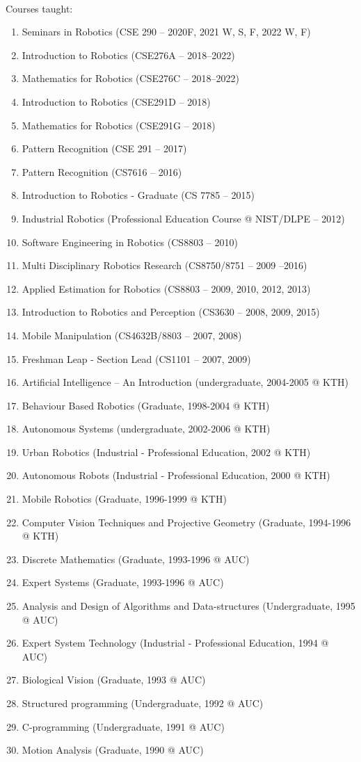 \documentclass{article}
\begin{document}
\begin{cv}
\begin{cvlist}{~}
\item[Courses taught:]
  \begin{enumerate}
  \item Seminars in Robotics (CSE 290 -- 2020F, 2021 W, S, F, 2022 W, F)
  \item Introduction to Robotics (CSE276A -- 2018--2022)
  \item Mathematics for Robotics (CSE276C -- 2018--2022)
  \item Introduction to Robotics (CSE291D -- 2018)
  \item Mathematics for Robotics (CSE291G -- 2018)
  \item Pattern Recognition (CSE 291 -- 2017)
  \item Pattern Recognition (CS7616 -- 2016)
  \item Introduction to Robotics - Graduate (CS 7785 -- 2015)
  \item Industrial Robotics (Professional Education Course @ NIST/DLPE
    -- 2012)
  \item Software Engineering in Robotics (CS8803 -- 2010)
  \item Multi Disciplinary Robotics Research (CS8750/8751 -- 2009 --2016)
  \item Applied Estimation for Robotics (CS8803 -- 2009, 2010, 2012, 2013)
  \item Introduction to Robotics and Perception (CS3630 -- 2008, 2009, 2015)
  \item Mobile Manipulation (CS4632B/8803 -- 2007, 2008)
  \item Freshman Leap - Section Lead (CS1101 -- 2007, 2009)
  \item Artificial Intelligence -- An Introduction (undergraduate,
    2004-2005 @ KTH)
  \item Behaviour Based Robotics (Graduate, 1998-2004 @ KTH)
  \item Autonomous Systems (undergraduate, 2002-2006 @ KTH)
  \item Urban Robotics (Industrial - Professional Education, 2002 @ KTH)
  \item Autonomous Robots (Industrial - Professional Education, 2000 @  KTH)
  \item Mobile Robotics (Graduate, 1996-1999 @ KTH)
  \item Computer Vision Techniques and Projective Geometry (Graduate,
    1994-1996 @ KTH)
  \item Discrete Mathematics (Graduate, 1993-1996 @ AUC)
  \item Expert Systems (Graduate, 1993-1996 @ AUC)
  \item Analysis and Design of Algorithms and Data-structures
    (Undergraduate, 1995 @ AUC)
  \item Expert System Technology (Industrial - Professional Education,
    1994 @ AUC)
  \item Biological Vision (Graduate, 1993 @ AUC)
  \item Structured programming (Undergraduate, 1992 @ AUC)
  \item C-programming (Undergraduate, 1991 @ AUC)
  \item Motion Analysis (Graduate, 1990 @ AUC)
 \end{enumerate}


\end{cvlist}
\end{cv}
\end{document}
